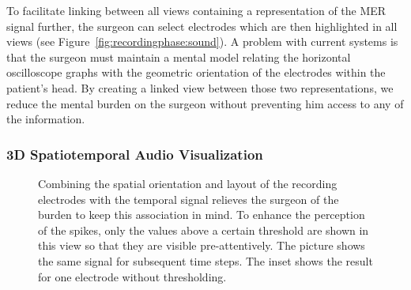\documentclass[review]{vgtc}                 %
\begin{document}
To facilitate linking between all views containing a representation of the MER signal further, the surgeon can select electrodes which are then highlighted in all views (see Figure~\ref{fig:recordingphase:sound}). A problem with current systems is that the surgeon must maintain a mental model relating the horizontal oscilloscope graphs with the geometric orientation of the electrodes within the patient's head. By creating a linked view between those two representations, we reduce the mental burden on the surgeon without preventing him access to any of the information.

\subsubsection{3D Spatiotemporal Audio Visualization}\label{sec:overview:recording:3daudio}
\begin{figure}[t]
    \centering
    \caption{Combining the spatial orientation and layout of the recording electrodes with the temporal signal relieves the surgeon of the burden to keep this association in mind. To enhance the perception of the spikes, only the values above a certain threshold are shown in this view so that they are visible pre-attentively. The picture shows the same signal for subsequent time steps. The inset shows the result for one electrode without thresholding.}
    \label{fig:recordingphase:3dsound}
\end{figure}
\end{document}
